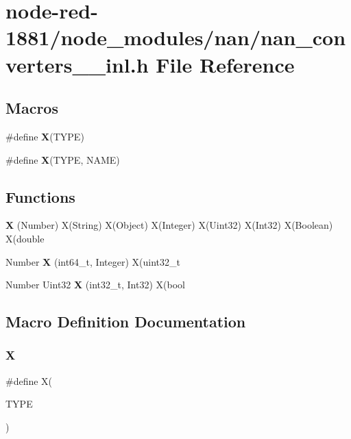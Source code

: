 \section{node-\/red-\/1881/node\+\_\+modules/nan/nan\+\_\+converters\+\_\+\_\+inl.h File Reference}
\label{nan__converters__43__inl_8h}
\subsection*{Macros}
\begin{DoxyCompactItemize}
\item 
\#define \textbf{ X}(T\+Y\+PE)
\item 
\#define \textbf{ X}(T\+Y\+PE,  N\+A\+ME)
\end{DoxyCompactItemize}
\subsection*{Functions}
\begin{DoxyCompactItemize}
\item 
\textbf{ X} (Number) X(String) X(Object) X(Integer) X(Uint32) X(Int32) X(Boolean) X(double
\item 
Number \textbf{ X} (int64\+\_\+t, Integer) X(uint32\+\_\+t
\item 
Number Uint32 \textbf{ X} (int32\+\_\+t, Int32) X(bool
\end{DoxyCompactItemize}


\subsection{Macro Definition Documentation}
\mbox{\label{nan__converters__43__inl_8h_ad9853fca332475faf665e45daaff16ab}} 
\subsubsection{X\hspace{0.1cm}{\footnotesize\ttfamily [1/2]}}
{\footnotesize\ttfamily \#define X(\begin{DoxyParamCaption}\item[{}]{T\+Y\+PE }\end{DoxyParamCaption})}


